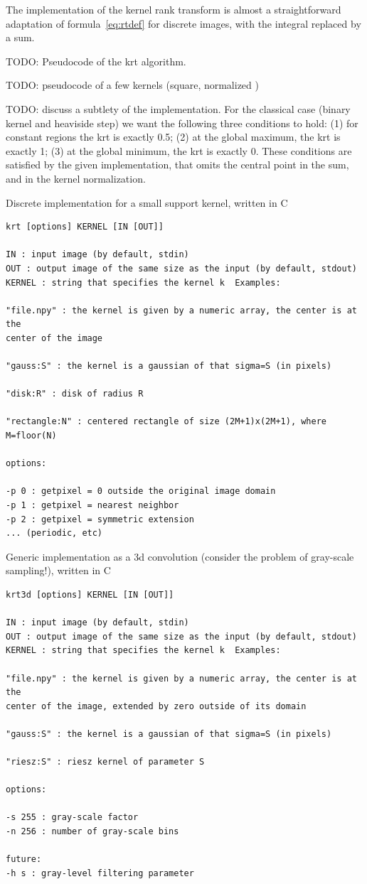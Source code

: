 \documentclass[12pt]{article}                  %
\begin{document}
The implementation of the kernel rank transform is almost a straightforward
adaptation of formula~\ref{eq:rtdef} for discrete images, with the integral
replaced by a sum.

TODO: Pseudocode of the krt algorithm.

TODO: pseudocode of a few kernels (square, normalized )

TODO: discuss a subtlety of the implementation.  For the classical case
(binary kernel and heaviside step) we want the following three conditions to
hold: (1) for constant regions the krt is exactly 0.5;  (2) at the global
maximum, the krt is exactly 1; (3) at the global minimum, the krt is exactly
0.  These conditions are satisfied by the given implementation, that omits
the central point in the sum, and in the kernel normalization.

Discrete implementation for a small support kernel, written in C

{\small
\begin{verbatim}
krt [options] KERNEL [IN [OUT]]

IN : input image (by default, stdin)
OUT : output image of the same size as the input (by default, stdout)
KERNEL : string that specifies the kernel k  Examples:

"file.npy" : the kernel is given by a numeric array, the center is at the
center of the image

"gauss:S" : the kernel is a gaussian of that sigma=S (in pixels)

"disk:R" : disk of radius R

"rectangle:N" : centered rectangle of size (2M+1)x(2M+1), where M=floor(N)

options:

-p 0 : getpixel = 0 outside the original image domain
-p 1 : getpixel = nearest neighbor
-p 2 : getpixel = symmetric extension
... (periodic, etc)

\end{verbatim}
}

Generic implementation as a 3d convolution (consider the problem of
gray-scale sampling!), written in C

{\small
\begin{verbatim}
krt3d [options] KERNEL [IN [OUT]]

IN : input image (by default, stdin)
OUT : output image of the same size as the input (by default, stdout)
KERNEL : string that specifies the kernel k  Examples:

"file.npy" : the kernel is given by a numeric array, the center is at the
center of the image, extended by zero outside of its domain

"gauss:S" : the kernel is a gaussian of that sigma=S (in pixels)

"riesz:S" : riesz kernel of parameter S

options:

-s 255 : gray-scale factor
-n 256 : number of gray-scale bins

future:
-h s : gray-level filtering parameter

\end{verbatim}
}
\end{document}
